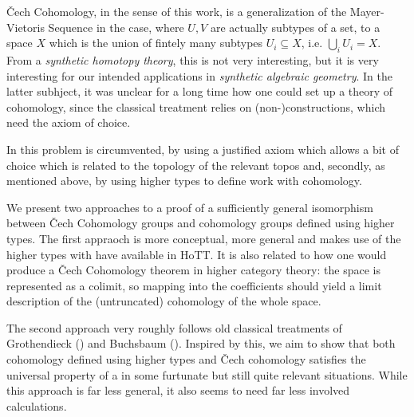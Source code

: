 \v{C}ech Cohomology, in the sense of this work,
is a generalization of the Mayer-Vietoris Sequence in the case, where $U,V$ are actually subtypes of a set,
to a space $X$ which is the union of fintely many subtypes $U_i\subseteq X$, i.e. $\bigcup_{i}U_i=X$.
From a \emph{synthetic homotopy theory}, this is not very interesting,
but it is very interesting for our intended applications in \emph{synthetic algebraic geometry}.
In the latter subhject, it was unclear for a long time how one could set up a theory of cohomology,
since the classical treatment relies on (non-)constructions, which need the axiom of choice.

In \cite{draft} this problem is circumvented,
by using a justified axiom which allows a bit of choice which is related to the topology of the relevant topos
and, secondly, as mentioned above, by using higher types to define work with cohomology.

We present two approaches to a proof of a sufficiently general isomorphism between \v{C}ech Cohomology groups
and cohomology groups defined using higher types.
The first appraoch is more conceptual, more general and makes use of the higher types with have available in HoTT.
It is also related to how one would produce a \v{C}ech Cohomology theorem in higher category theory:
the space is represented as a colimit, so mapping into the coefficients should yield a limit description of
the (untruncated) cohomology of the whole space.

The second approach very roughly follows old classical treatments of Grothendieck (\cite{tohoku1957}) and Buchsbaum (\cite{buchsbaum}).
Inspired by this, we aim to show that both cohomology defined using higher types and \v{C}ech cohomology satisfies the universal property
of a  in some furtunate but still quite relevant situations.
While this approach is far less general, it also seems to need far less involved calculations.

